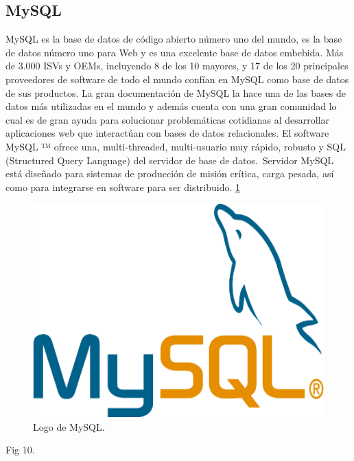 \subsection{MySQL}
MySQL es la base de datos de código abierto número uno del mundo, es la base de datos número uno para Web y es una excelente base de datos embebida. Más de 3.000 ISVs y OEMs, incluyendo 8 de los 10 mayores, y 17 de los 20 principales proveedores de software de todo el mundo confían en MySQL como base de datos de sus productos.
La gran documentación de MySQL la hace una de las bases de datos más utilizadas en el mundo y además cuenta con una gran comunidad lo cual es de gran ayuda para solucionar problemáticas cotidianas al desarrollar aplicaciones web que interactúan con bases de datos relacionales.
El software MySQL ™ ofrece una, multi-threaded, multi-usuario muy rápido, robusto y SQL (Structured Query Language) del servidor de base de datos. Servidor MySQL está diseñado para sistemas de producción de misión crítica, carga pesada, así como para integrarse en software para ser distribuido. \cite{mysql} \ref{figura12}
\begin{figure}[h]
  \label{figura12}
  \centering
  \includegraphics[scale=1]{lib/assets/12}
  \caption{Logo de MySQL.}
\end{figure}


Fig 10.
